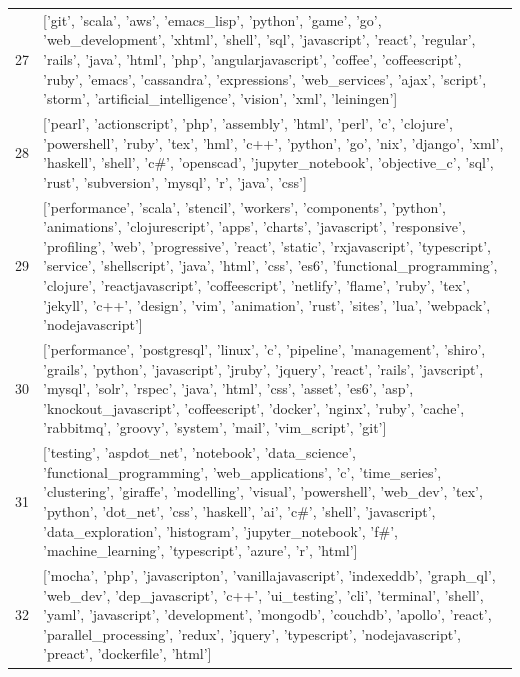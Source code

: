\begin{center}
\begin{longtable}{|p{1.5cm}|p{12.5cm}|}
            27 & ['git', 'scala', 'aws', 'emacs\_lisp', 'python', 'game', 'go', 'web\_development', 'xhtml', 'shell', 'sql', 'javascript', 'react', 'regular', 'rails', 'java', 'html', 'php', 'angularjavascript', 'coffee', 'coffeescript', 'ruby', 'emacs', 'cassandra', 'expressions', 'web\_services', 'ajax', 'script', 'storm', 'artificial\_intelligence', 'vision', 'xml', 'leiningen']  \\ 
            28 & ['pearl', 'actionscript', 'php', 'assembly', 'html', 'perl', 'c', 'clojure', 'powershell', 'ruby', 'tex', 'hml', 'c++', 'python', 'go', 'nix', 'django', 'xml', 'haskell', 'shell', 'c\#', 'openscad', 'jupyter\_notebook', 'objective\_c', 'sql', 'rust', 'subversion', 'mysql', 'r', 'java', 'css']  \\ 
            29 & ['performance', 'scala', 'stencil', 'workers', 'components', 'python', 'animations', 'clojurescript', 'apps', 'charts', 'javascript', 'responsive', 'profiling', 'web', 'progressive', 'react', 'static', 'rxjavascript', 'typescript', 'service', 'shellscript', 'java', 'html', 'css', 'es6', 'functional\_programming', 'clojure', 'reactjavascript', 'coffeescript', 'netlify', 'flame', 'ruby', 'tex', 'jekyll', 'c++', 'design', 'vim', 'animation', 'rust', 'sites', 'lua', 'webpack', 'nodejavascript']  \\ 
            30 & ['performance', 'postgresql', 'linux', 'c', 'pipeline', 'management', 'shiro', 'grails', 'python', 'javascript', 'jruby', 'jquery', 'react', 'rails', 'javscript', 'mysql', 'solr', 'rspec', 'java', 'html', 'css', 'asset', 'es6', 'asp', 'knockout\_javascript', 'coffeescript', 'docker', 'nginx', 'ruby', 'cache', 'rabbitmq', 'groovy', 'system', 'mail', 'vim\_script', 'git']  \\ 
            31 & ['testing', 'aspdot\_net', 'notebook', 'data\_science', 'functional\_programming', 'web\_applications', 'c', 'time\_series', 'clustering', 'giraffe', 'modelling', 'visual', 'powershell', 'web\_dev', 'tex', 'python', 'dot\_net', 'css', 'haskell', 'ai', 'c\#', 'shell', 'javascript', 'data\_exploration', 'histogram', 'jupyter\_notebook', 'f\#', 'machine\_learning', 'typescript', 'azure', 'r', 'html']  \\ 
            32 & ['mocha', 'php', 'javascripton', 'vanillajavascript', 'indexeddb', 'graph\_ql', 'web\_dev', 'dep\_javascript', 'c++', 'ui\_testing', 'cli', 'terminal', 'shell', 'yaml', 'javascript', 'development', 'mongodb', 'couchdb', 'apollo', 'react', 'parallel\_processing', 'redux', 'jquery', 'typescript', 'nodejavascript', 'preact', 'dockerfile', 'html']  \\ 

\end{longtable}
\end{center}
